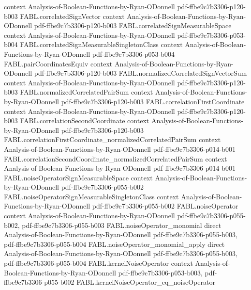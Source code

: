 \begin{theorem}
  {context}
  {Analysis-of-Boolean-Functions-by-Ryan-ODonnell}
  {pdf-ffbe9c7b3306-p120-b003}
\proofstep
  {FABL.correlatedSignVector}
  {context}
  {Analysis-of-Boolean-Functions-by-Ryan-ODonnell}
  {pdf-ffbe9c7b3306-p120-b003}
\proofstep
  {FABL.correlatedSignMeasurableSpace}
  {context}
  {Analysis-of-Boolean-Functions-by-Ryan-ODonnell}
  {pdf-ffbe9c7b3306-p053-b004}
\proofstep
  {FABL.correlatedSignMeasurableSingletonClass}
  {context}
  {Analysis-of-Boolean-Functions-by-Ryan-ODonnell}
  {pdf-ffbe9c7b3306-p053-b004}
\proofstep
  {FABL.pairCoordinatesEquiv}
  {context}
  {Analysis-of-Boolean-Functions-by-Ryan-ODonnell}
  {pdf-ffbe9c7b3306-p120-b003}
\proofstep
  {FABL.normalizedCorrelatedSignVectorSum}
  {context}
  {Analysis-of-Boolean-Functions-by-Ryan-ODonnell}
  {pdf-ffbe9c7b3306-p120-b003}
\proofstep
  {FABL.normalizedCorrelatedPairSum}
  {context}
  {Analysis-of-Boolean-Functions-by-Ryan-ODonnell}
  {pdf-ffbe9c7b3306-p120-b003}
\proofstep
  {FABL.correlationFirstCoordinate}
  {context}
  {Analysis-of-Boolean-Functions-by-Ryan-ODonnell}
  {pdf-ffbe9c7b3306-p120-b003}
\proofstep
  {FABL.correlationSecondCoordinate}
  {context}
  {Analysis-of-Boolean-Functions-by-Ryan-ODonnell}
  {pdf-ffbe9c7b3306-p120-b003}
\proofstep
  {FABL.correlationFirstCoordinate_normalizedCorrelatedPairSum}
  {context}
  {Analysis-of-Boolean-Functions-by-Ryan-ODonnell}
  {pdf-ffbe9c7b3306-p014-b001}
\proofstep
  {FABL.correlationSecondCoordinate_normalizedCorrelatedPairSum}
  {context}
  {Analysis-of-Boolean-Functions-by-Ryan-ODonnell}
  {pdf-ffbe9c7b3306-p014-b001}
\proofstep
  {FABL.noiseOperatorSignMeasurableSpace}
  {context}
  {Analysis-of-Boolean-Functions-by-Ryan-ODonnell}
  {pdf-ffbe9c7b3306-p055-b002}
\proofstep
  {FABL.noiseOperatorSignMeasurableSingletonClass}
  {context}
  {Analysis-of-Boolean-Functions-by-Ryan-ODonnell}
  {pdf-ffbe9c7b3306-p055-b002}
\proofstep
  {FABL.noiseOperator}
  {context}
  {Analysis-of-Boolean-Functions-by-Ryan-ODonnell}
  {pdf-ffbe9c7b3306-p055-b002,
    pdf-ffbe9c7b3306-p055-b003}
\proofstep
  {FABL.noiseOperator_monomial}
  {direct}
  {Analysis-of-Boolean-Functions-by-Ryan-ODonnell}
  {pdf-ffbe9c7b3306-p055-b003,
    pdf-ffbe9c7b3306-p055-b004}
\proofstep
  {FABL.noiseOperator_monomial_apply}
  {direct}
  {Analysis-of-Boolean-Functions-by-Ryan-ODonnell}
  {pdf-ffbe9c7b3306-p055-b003,
    pdf-ffbe9c7b3306-p055-b004}
\proofstep
  {FABL.kernelNoiseOperator}
  {context}
  {Analysis-of-Boolean-Functions-by-Ryan-ODonnell}
  {pdf-ffbe9c7b3306-p053-b003,
    pdf-ffbe9c7b3306-p055-b002}
\proofstep
  {FABL.kernelNoiseOperator_eq_noiseOperator}

\end{theorem}
